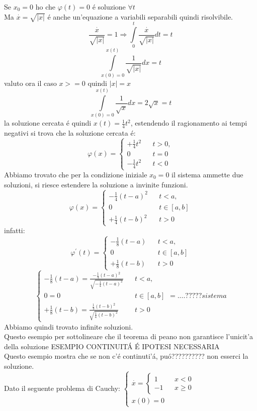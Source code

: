 Se $x_0 = 0$ ho che $\varphi(t)=0$ \'e soluzione $\forall t$\\
Ma $\overset{\cdot}{x} = \sqrt{|x|}$ \'e anche un'equazione a variabili separabili quindi risolvibile.\\
$$\frac{\overset{\cdot}{x}}{\sqrt{|x|}}=1 \Rightarrow \int\limits_{0}^{t}{\frac{\overset{\cdot}{x}}{\sqrt{|x|}}dt} = t$$
$$\int\limits_{x(0)=0}^{x(t)}{\frac{1}{\sqrt{|x|}}dx} = t$$
valuto ora il caso $x>=0$ quindi $|x|=x$
$$ \int\limits_{x(0)=0}^{x(t)}{\frac{1}{\sqrt{x}}dx} = 2\sqrt{x} = t$$ 
la soluzione cercata \'e quindi $x(t)=\frac{1}{4}t^2$, 
estendendo il ragionamento ai tempi negativi si trova che la soluzione cercata \'e: $$\varphi(x)= \left\{\begin{matrix}+\frac{1}{4}t^2&&t>0,\\0&&t=0\\-\frac{1}{4}t^2&&t<0\end{matrix}\right.$$ 
Abbiamo trovato che per la condizione iniziale $x_0=0$ il sistema ammette due soluzioni, si riesce estendere la soluzione a invinite funzioni.
$$\varphi(x)= \left\{\begin{matrix}-\frac{1}{4}(t-a)^2&&t<a,\\0&&t\in[a,b]\\+\frac{1}{4}(t-b)^2&&t>0\end{matrix}\right.$$
infatti:
$$\varphi^{'}(t) = \left\{\begin{matrix}-\frac{1}{8}(t-a)&&t<a,\\0&&t\in[a,b]\\+\frac{1}{8}(t-b)&&t>0\end{matrix}\right.$$ $$\left\{\begin{matrix}-\frac{1}{8}(t-a)=\frac{-\frac{1}{4}(t-a)^2}{	\sqrt{-\frac{1}{4}(t-a)^2}}&&t<a,\\0=0&&t\in[a,b]\\+\frac{1}{8}(t-b)=\frac{\frac{1}{4}(t-b)^2}{\sqrt{\frac{1}{4}(t-b)^2}}&&t>0\end{matrix}\right. = ....????? sistema $$
Abbiamo quindi trovato infinite soluzioni.\\
Questo esempio per sottolineare che il teorema di peano non garantisce l'unicit'a della soluzione
ESEMPIO CONTINUIT\'A \'E IPOTESI NECESSARIA\\
Questo esempio mostra che se non c'\'e continuti'\'a, pu\'o?????????? non esserci la soluzione.\\
Dato il seguente problema di Cauchy: $\left\{\begin{matrix}
\overset{\cdot}{x} = \left\{\begin{matrix}1&&x<0\\-1&&x\ge 0\end{matrix}\right.\\
x(0)=0
\end{matrix}\right.$\\
